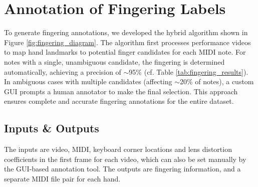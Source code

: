 \documentclass{article}
\begin{document}

\section{Annotation of Fingering Labels}\label{sec:fingering_detection}
To generate fingering annotations, we developed the hybrid algorithm shown in Figure \ref{fig:fingering_diagram}. The algorithm first processes performance videos to map hand landmarks to potential finger candidates for each MIDI note. For notes with a single, unambiguous candidate, the fingering is determined automatically, achieving a precision of $\sim$95\% (cf. Table \ref{tab:fingering_results}). In ambiguous cases with multiple candidates (affecting $\sim$20\% of notes), a custom GUI prompts a human annotator to make the final selection. This approach ensures complete and accurate fingering annotations for the entire dataset.


\subsection{Inputs \& Outputs}
The inputs are video, MIDI, keyboard corner locations and lens distortion coefficients in the first frame for each video, which can also be set manually by the GUI-based annotation tool.
The outputs are fingering information, and a separate MIDI file pair for each hand.
\end{document}

